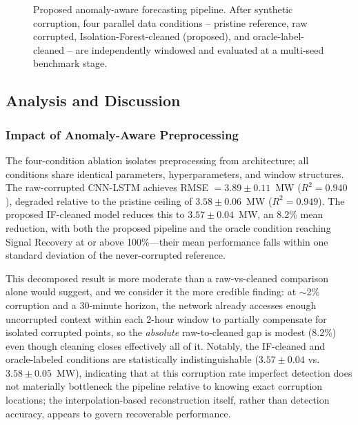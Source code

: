 \documentclass[conference]{IEEEtran}
\begin{document}
\begin{figure}[!t]
{%
}
\caption{Proposed anomaly-aware forecasting pipeline. After synthetic corruption, four parallel data conditions -- pristine reference, raw corrupted, Isolation-Forest-cleaned (proposed), and oracle-label-cleaned -- are independently windowed and evaluated at a multi-seed benchmark stage.}
\label{fig:architecture}
\end{figure}

\subsection{Analysis and Discussion}

\subsubsection{Impact of Anomaly-Aware Preprocessing}
The four-condition ablation isolates preprocessing from architecture; all conditions share identical parameters, hyperparameters, and window structures. The raw-corrupted CNN-LSTM achieves RMSE $=3.89 \pm 0.11$~MW ($R^2 = 0.940$), degraded relative to the pristine ceiling of $3.58 \pm 0.06$~MW ($R^2 = 0.949$). The proposed IF-cleaned model reduces this to $3.57 \pm 0.04$~MW, an 8.2\% mean reduction, with both the proposed pipeline and the oracle condition reaching Signal Recovery at or above 100\%---their mean performance falls within one standard deviation of the never-corrupted reference.

This decomposed result is more moderate than a raw-vs-cleaned comparison alone would suggest, and we consider it the more credible finding: at $\sim$2\% corruption and a 30-minute horizon, the network already accesses enough uncorrupted context within each 2-hour window to partially compensate for isolated corrupted points, so the \emph{absolute} raw-to-cleaned gap is modest (8.2\%) even though cleaning closes effectively all of it. Notably, the IF-cleaned and oracle-labeled conditions are statistically indistinguishable ($3.57 \pm 0.04$ vs.\ $3.58 \pm 0.05$~MW), indicating that at this corruption rate imperfect detection does not materially bottleneck the pipeline relative to knowing exact corruption locations; the interpolation-based reconstruction itself, rather than detection accuracy, appears to govern recoverable performance.
\end{document}
